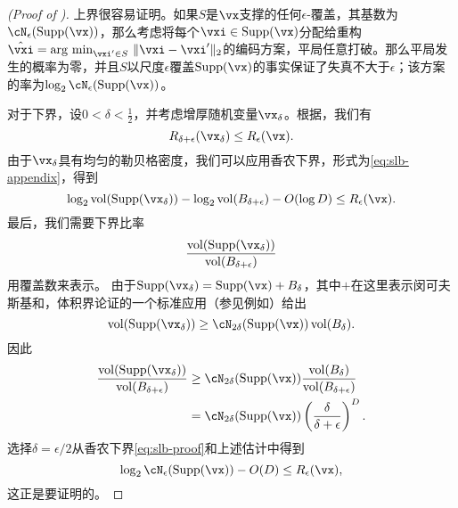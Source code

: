 \documentclass[../../book-main.tex]{subfiles}
\begin{document}
\begin{proof}[(Proof of )]
    上界很容易证明。如果$S$是$\vx$支撑的任何$\epsilon$-覆盖，其基数为$\cN_{\epsilon}(\Supp(\vx))$，那么考虑将每个$\vxi \in \Supp(\vx)$分配给重构$\hat{\vxi} = \argmin_{\vxi' \in S}\, \norm{\vxi - \vxi'}_2$的编码方案，平局任意打破。那么平局发生的概率为零，并且$S$以尺度$\epsilon$覆盖$\Supp(\vx)$的事实保证了失真不大于$\epsilon$；该方案的率为$\log_2 \cN_{\epsilon}(\Supp(\vx))$。

    对于下界，设$0 < \delta < \tfrac{1}{2}$，并考虑增厚随机变量$\vx_{\delta}$。根据，我们有
    \begin{equation}
        R_{\delta + \epsilon}(\vx_{\delta})
        \leq
        R_{\epsilon}(\vx).
    \end{equation}
    由于$\vx_{\delta}$具有均匀的勒贝格密度，我们可以应用香农下界，形式为\eqref{eq:slb-appendix}，得到
    \begin{equation}\label{eq:slb-proof}
        \log_2 \volume(\Supp(\vx_{\delta}))
        - \log_2 \volume(B_{\delta + \epsilon})
        - O(\log D)
        \leq
        R_{\epsilon}(\vx).
    \end{equation}
    最后，我们需要下界比率
    \begin{equation}
        \frac{
            \volume(\Supp(\vx_{\delta}))
        }
        {
            \volume(B_{\delta + \epsilon})
        }
    \end{equation}
    用覆盖数来表示。
    由于$\Supp(\vx_{\delta}) = \Supp(\vx) + B_{\delta}$，其中$+$在这里表示闵可夫斯基和，体积界论证的一个标准应用（参见例如\cite[命题 4.2.12]{Vershynin2018-br}）给出
    \begin{equation}
        \volume(\Supp(\vx_{\delta}))
        \geq
        \cN_{2\delta}(\Supp(\vx))
        \volume(B_{\delta}).
    \end{equation}
    因此
    \begin{align}
        \frac{
            \volume(\Supp(\vx_{\delta}))
        }
        {
            \volume(B_{\delta + \epsilon})
        }
        &\geq
        \cN_{2\delta}(\Supp(\vx))
        \frac{
            \volume(B_{\delta})
        }
        {
            \volume(B_{\delta + \epsilon})
        }
        \\
        &=
        \cN_{2\delta}(\Supp(\vx))
        \left(
            \frac{
                \delta
            } 
            {
                \delta + \epsilon
            }
        \right)^D.
    \end{align}
    选择$\delta = \epsilon / 2$从香农下界\eqref{eq:slb-proof}和上述估计中得到
    \begin{equation}
        \log_2 \cN_{\epsilon}(\Supp(\vx))
        - O(D)
        \leq
        R_{\epsilon}(\vx),
    \end{equation}
    这正是要证明的。

\end{proof}
\end{document}
